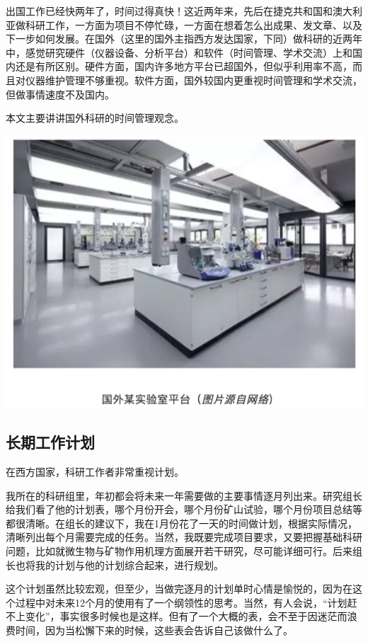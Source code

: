 \documentclass[]{book}
\begin{document}
出国工作已经快两年了，时间过得真快！这近两年来，先后在捷克共和国和澳大利亚做科研工作，一方面为项目不停忙碌，一方面在想着怎么出成果、发文章、以及下一步如何发展。在国外（这里的国外主指西方发达国家，下同）做科研的近两年中，感觉研究硬件（仪器设备、分析平台）和软件（时间管理、学术交流）上和国内还是有所区别。硬件方面，国内许多地方平台已超国外，但似乎利用率不高，而且对仪器维护管理不够重视。软件方面，国外较国内更重视时间管理和学术交流，但做事情速度不及国内。

本文主要讲讲国外科研的时间管理观念。

\includegraphics[width=8.33in]{images/osre1}

\subsection{长期工作计划}

在西方国家，科研工作者非常重视计划。

我所在的科研组里，年初都会将未来一年需要做的主要事情逐月列出来。研究组长给我们看了他的计划表，哪个月份开会，哪个月份矿山试验，哪个月份项目总结等都很清晰。在组长的建议下，我在1月份花了一天的时间做计划，根据实际情况，清晰列出每个月需要完成的任务。当然，我既要完成项目要求，又要把握基础科研问题，比如就微生物与矿物作用机理方面展开若干研究，尽可能详细可行。后来组长也将我的计划与他的计划综合起来，进行规划。

这个计划虽然比较宏观，但至少，当做完逐月的计划单时心情是愉悦的，因为在这个过程中对未来12个月的使用有了一个纲领性的思考。当然，有人会说，``计划赶不上变化''，事实很多时候也是这样。但有了一个大概的表，会不至于因迷茫而浪费时间，因为当松懈下来的时候，这些表会告诉自己该做什么了。
\end{document}
